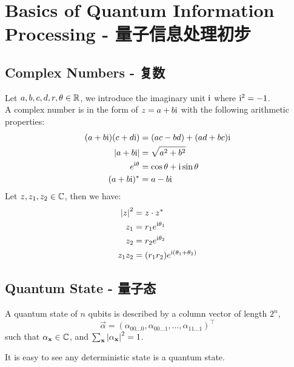 \section{Basics of Quantum Information Processing - 量子信息处理初步}
\subsection{Complex Numbers - 复数}
Let $a, b, c, d, r, \theta \in \mathbb{R}$, we introduce the imaginary unit $\mathrm{i}$ where $\mathrm{i}^2 = -1$. \\
A complex number is in the form of $z = a + b\mathrm{i}$ with the following arithmetic properties:
\begin{align*}
    (a + b\mathrm{i})(c + d\mathrm{i}) &= (ac - bd) + (ad + bc)\mathrm{i} \\
    \abs{a + b\mathrm{i}} &= \sqrt{a^2 + b^2} \\
    e^{\mathrm{i} \theta} &= \cos \theta + \mathrm{i} \sin \theta \\
    (a + b \mathrm{i})^{*} &= a - b\mathrm{i}
\end{align*}
Let $z, z_1, z_2 \in \mathbb{C}$, then we have:
\begin{align*}
    \abs{z}^2 &= z \cdot z^{*} \\
    z_1 &= r_1 e^{\mathrm{i} \theta_1} \\
    z_2 &= r_2 e^{\mathrm{i} \theta_2} \\
    z_1z_2 &= (r_1r_2) e^{\mathrm{i} (\theta_1  + \theta_2)}
\end{align*}

\subsection{Quantum State - 量子态}
\begin{definition}
    A quantum state of $n$ qubits is described by a column vector of length $2^n$,
    $$\vec{\alpha} = (\alpha_{00 \dots 0}, \alpha_{00 \dots 1}, \dots, \alpha_{11 \dots 1})^\top$$
    such that $\alpha_{\mathbf{x}} \in \mathbb{C}$, and $\sum_{\mathbf{x}} \abs{\alpha_{\mathbf{x}}}^2 = 1$.
\end{definition}
It is easy to see any deterministic state is a quantum state.


